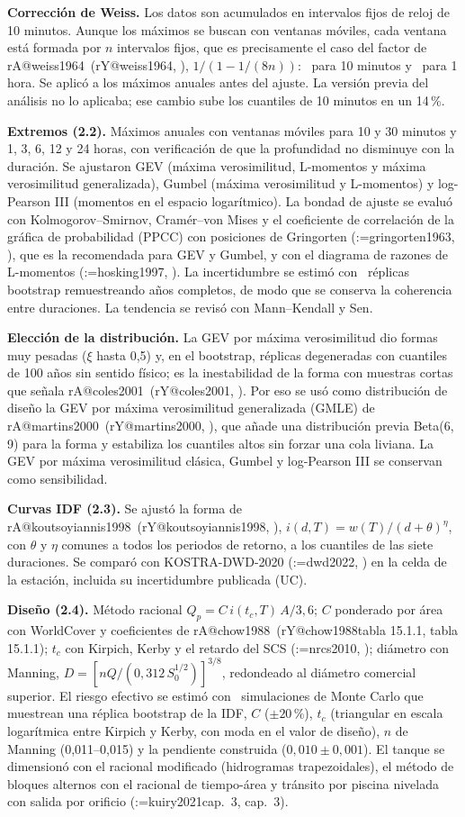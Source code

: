 \documentclass[12pt,a4paper]{article}
\makeatletter
\newcommand{\parencite}[2][]{(\@tempswafalse\@for\rk:=#2\do{\if@tempswa; \fi\@tempswatrue\csname rA@\rk\endcsname, \csname rY@\rk\endcsname}\ifx\relax#1\relax\else, #1\fi)}
\newcommand{\textcite}[2][]{\csname rA@#2\endcsname\ (\csname rY@#2\endcsname\ifx\relax#1\relax\else, #1\fi)}
\makeatother
\begin{document}
\textbf{Corrección de Weiss.} Los datos son acumulados en intervalos fijos de reloj de 10 minutos. Aunque los máximos se buscan con ventanas móviles, cada ventana está formada por $n$ intervalos fijos, que es precisamente el caso del factor de \textcite{weiss1964}, $1/(1-1/(8n))$: \WeissDiez\ para 10 minutos y \WeissHora\ para 1 hora. Se aplicó a los máximos anuales antes del ajuste. La versión previa del análisis no lo aplicaba; ese cambio sube los cuantiles de 10 minutos en un 14\,\%.

\textbf{Extremos (2.2).} Máximos anuales con ventanas móviles para 10 y 30 minutos y 1, 3, 6, 12 y 24 horas, con verificación de que la profundidad no disminuye con la duración. Se ajustaron GEV (máxima verosimilitud, L-momentos y máxima verosimilitud generalizada), Gumbel (máxima verosimilitud y L-momentos) y log-Pearson III (momentos en el espacio logarítmico). La bondad de ajuste se evaluó con Kolmogorov--Smirnov, Cramér--von Mises y el coeficiente de correlación de la gráfica de probabilidad (PPCC) con posiciones de Gringorten \parencite{gringorten1963}, que es la recomendada para GEV y Gumbel, y con el diagrama de razones de L-momentos \parencite{hosking1997}. La incertidumbre se estimó con \NBoot\ réplicas bootstrap remuestreando años completos, de modo que se conserva la coherencia entre duraciones. La tendencia se revisó con Mann--Kendall y Sen.

\textbf{Elección de la distribución.} La GEV por máxima verosimilitud dio formas muy pesadas ($\xi$ hasta 0,5) y, en el bootstrap, réplicas degeneradas con cuantiles de 100 años sin sentido físico; es la inestabilidad de la forma con muestras cortas que señala \textcite{coles2001}. Por eso se usó como distribución de diseño la GEV por máxima verosimilitud generalizada (GMLE) de \textcite{martins2000}, que añade una distribución previa Beta(6, 9) para la forma y estabiliza los cuantiles altos sin forzar una cola liviana. La GEV por máxima verosimilitud clásica, Gumbel y log-Pearson III se conservan como sensibilidad.

\textbf{Curvas IDF (2.3).} Se ajustó la forma de \textcite{koutsoyiannis1998}, $i(d,T)=w(T)/(d+\theta)^{\eta}$, con $\theta$ y $\eta$ comunes a todos los periodos de retorno, a los cuantiles de las siete duraciones. Se comparó con KOSTRA-DWD-2020 \parencite{dwd2022} en la celda de la estación, incluida su incertidumbre publicada (UC).

\textbf{Diseño (2.4).} Método racional $Q_p=C\,i(t_c,T)\,A/3{,}6$; $C$ ponderado por área con WorldCover y coeficientes de \textcite[tabla 15.1.1]{chow1988}; $t_c$ con Kirpich, Kerby y el retardo del SCS \parencite{nrcs2010}; diámetro con Manning, $D=[nQ/(0{,}312\,S_0^{1/2})]^{3/8}$, redondeado al diámetro comercial superior. El riesgo efectivo se estimó con \NMC\ simulaciones de Monte Carlo que muestrean una réplica bootstrap de la IDF, $C$ ($\pm20$\,\%), $t_c$ (triangular en escala logarítmica entre Kirpich y Kerby, con moda en el valor de diseño), $n$ de Manning (0,011--0,015) y la pendiente construida ($0{,}010\pm0{,}001$). El tanque se dimensionó con el racional modificado (hidrogramas trapezoidales), el método de bloques alternos con el racional de tiempo-área y tránsito por piscina nivelada con salida por orificio \parencite[cap.~3]{kuiry2021}.
\end{document}
